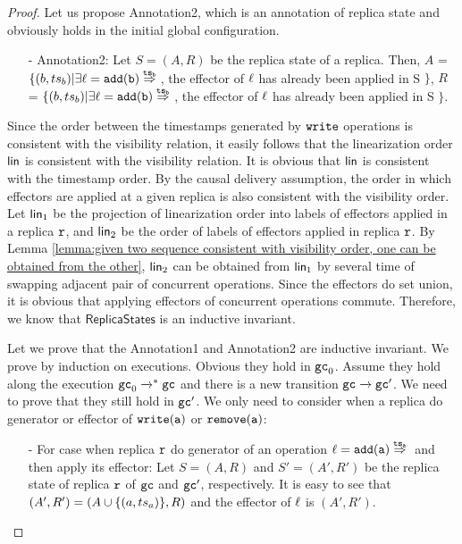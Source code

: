\begin {proof}

Let us propose Annotation2, which is an annotation of replica state and obviously holds in the initial global configuration.

\begin{itemize}
\setlength{\itemsep}{0.5pt}
\item[-] Annotation2: Let $S = (A,R)$ be the replica state of a replica. Then, $A$ =  $\{ (b,\ats_b) \vert \exists \alabel = \alabellongind[{\tt add}]{b}{}{\ats_b}{}$, the effector of $\ell$ has already been applied in S $\}$,
    $R$ =  $\{ (b,\ats_b) \vert \exists \alabel = \alabellongind[{\tt add}]{b}{}{\ats_b}{}$, the effector of $\ell$ has already been applied in S $\}$.
\end{itemize}

Since the order between the timestamps generated by ${\tt write}$ operations is consistent with the visibility relation, it easily follows that the linearization order $\mathsf{lin}$ is consistent with the visibility relation. It is obvious that $\mathsf{lin}$ is consistent with the timestamp order. By the causal delivery assumption, the order in which effectors are applied at a given replica is also consistent with the visibility order. Let $\mathsf{lin}_1$ be the projection of linearization order into labels of effectors applied in a replica $\mathtt{r}$, and $\mathsf{lin}_2$ be the order of labels of effectors applied in replica $\mathtt{r}$. By Lemma \ref{lemma:given two sequence consistent with visibility order, one can be obtained from the other}, $\mathsf{lin}_2$ can be obtained from $\mathsf{lin}_1$ by several time of swapping adjacent pair of concurrent operations. Since the effectors do set union, it is obvious that applying effectors of concurrent operations commute. Therefore, we know that $\mathsf{ReplicaStates}$ is an inductive invariant.

Let we prove that the Annotation1 and Annotation2 are inductive invariant. We prove by induction on executions. Obvious they hold in $\mathtt{gc}_0$. Assume they hold along the execution $\mathtt{gc}_0 \xrightarrow{}^* \mathtt{gc}$ and there is a new transition $\mathtt{gc} \xrightarrow{} \mathtt{gc}'$. We need to prove that they still hold in $\mathtt{gc}'$. We only need to consider when a replica do generator or effector of $\alabelshort[{\tt write}]{a}$ or $\alabelshort[{\tt remove}]{a}$:

\begin{itemize}
\setlength{\itemsep}{0.5pt}
\item[-] For case when replica $\mathtt{r}$ do generator of an operation $\alabel = \alabellongind[{\tt add}]{a}{}{\ats_a}{}$ and then apply its effector: Let $S=(A,R)$ and $S'=(A',R')$ be the replica state of replica $\mathtt{r}$ of $\mathtt{gc}$ and $\mathtt{gc}'$, respectively. It is easy to see that $(A',R') = (A \cup \{ (a,ts_a) \},R)$ and the effector of $\ell$ is $(A',R')$.


\end{itemize}
\end{proof}
